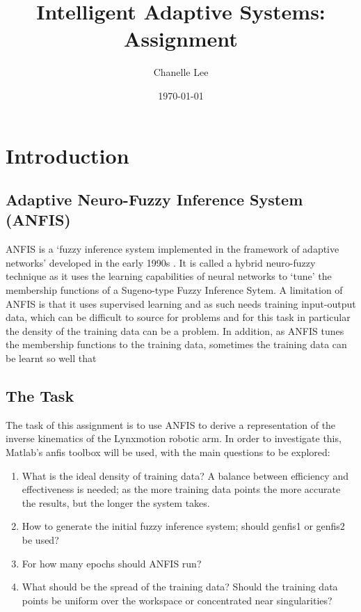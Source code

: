 \documentclass[11.5pt, twoside, a4paper]{article}
\begin{document}
\title{Intelligent Adaptive Systems: Assignment}
\author{Chanelle Lee}
\date{\today}
\maketitle

\section{Introduction}

\subsection{Adaptive Neuro-Fuzzy Inference System (ANFIS)} %
ANFIS is a `fuzzy inference system implemented in the framework of adaptive networks' developed in the early 1990s \cite{JangANFIS}. It is called a hybrid neuro-fuzzy technique as it uses the learning capabilities of neural networks to `tune' the membership functions of a Sugeno-type Fuzzy Inference Sytem. A limitation of ANFIS is that it uses supervised learning and as such needs training input-output data, which can be difficult to source for problems and for this task in particular the density of the training data can be a problem. In addition, as ANFIS tunes the membership functions to the training data, sometimes the training data can be learnt so well that 

\subsection{The Task}
The task of this assignment is to use ANFIS to derive a representation of the inverse kinematics of the Lynxmotion robotic arm. In order to investigate this, Matlab's anfis toolbox will be used, with the main questions to be explored:
\begin{enumerate}
\item What is the ideal density of training data? A balance between efficiency and effectiveness is needed; as the more training data points the more accurate the results, but the longer the system takes.
\item How to generate the initial fuzzy inference system; should genfis1 or genfis2 be used? 
\item For how many epochs should ANFIS run?
\item What should be the spread of the training data? Should the training data points be uniform over the workspace or concentrated near singularities?
\end{enumerate}
\end{document}
